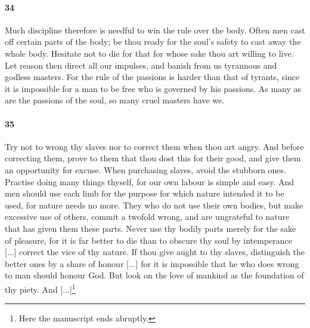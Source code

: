 \documentclass[12pt]{article}
\begin{document}
\paragraph{34} Much discipline therefore is needful to win the rule over the body. Often men cast off certain parts of the body; be thou ready for the soul's safety to cast away the whole body. Hesitate not to die for that for whose sake thou art willing to live. Let reason then direct all our impulses, and banish from us tyrannous and godless masters. For the rule of the passions is harder than that of tyrants, since it is impossible for a man to be free who is governed by his passions. As many as are the passions of the soul, so many cruel masters have we. 

\paragraph{35} Try not to wrong thy slaves nor to correct them when thou art angry. And before correcting them, prove to them that thou dost this for their good, and give them an opportunity for excuse. When purchasing slaves, avoid the stubborn ones. Practise doing many things thyself, for our own labour is simple and easy. And men should use each limb for the purpose for which nature intended it to be used, for nature needs no more. They who do not use their own bodies, but make excessive use of others, commit a twofold wrong, and are ungrateful to nature that has given them these parts. Never use thy bodily parts merely for the sake of pleasure, for it is far better to die than to obscure thy soul by intemperance [...] correct the vice of thy nature. If thou give aught to thy slaves, distinguish the better ones by a share of honour [...] for it is impossible that he who does wrong to man should honour God. But look on the love of mankind as the foundation of thy piety. And [...]\footnote{Here the manuscript ends abruptly.}
\end{document}
